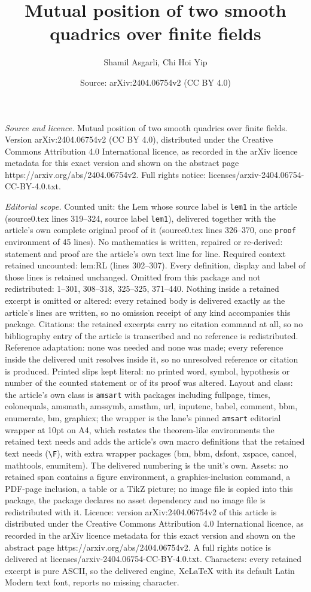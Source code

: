 \documentclass[10pt,a4paper]{amsart}
\title[Mutual position of two smooth quadrics over finite fields]{Mutual position of two smooth quadrics over finite fields}
\author{Shamil Asgarli, Chi Hoi Yip}
\date{Source: arXiv:2404.06754v2 (CC BY 4.0)}
\begin{document}
\maketitle

\noindent\emph{Source and licence.} Mutual position of two smooth quadrics over finite fields. Version arXiv:2404.06754v2 (CC BY 4.0), distributed under the Creative Commons Attribution 4.0 International licence, as recorded in the arXiv licence metadata for this exact version and shown on the abstract page https://arxiv.org/abs/2404.06754v2. Full rights notice: licenses/arxiv-2404.06754-CC-BY-4.0.txt.\par\smallskip

\noindent\textit{Editorial scope.} Counted unit: the Lem whose source label is \texttt{lem1} in the article (source0.tex lines 319--324, source label \texttt{lem1}), delivered together with the article's own complete original proof of it (source0.tex lines 326--370, one \texttt{proof} environment of 45 lines). No mathematics is written, repaired or re-derived: statement and proof are the article's own text line for line. Required context retained uncounted: lem:RL (lines 302--307). Every definition, display and label of those lines is retained unchanged. Omitted from this package and not redistributed: 1--301, 308--318, 325--325, 371--440. Nothing inside a retained excerpt is omitted or altered: every retained body is delivered exactly as the article's lines are written, so no omission receipt of any kind accompanies this package. Citations: the retained excerpts carry no citation command at all, so no bibliography entry of the article is transcribed and no reference is redistributed. Reference adaptation: none was needed and none was made; every reference inside the delivered unit resolves inside it, so no unresolved reference or citation is produced. Printed slips kept literal: no printed word, symbol, hypothesis or number of the counted statement or of its proof was altered. Layout and class: the article's own class is \texttt{amsart} with packages including fullpage, times, colonequals, amsmath, amssymb, amsthm, url, inputenc, babel, comment, bbm, enumerate, bm, graphicx; the wrapper is the lane's pinned \texttt{amsart} editorial wrapper at 10pt on A4, which restates the theorem-like environments the retained text needs and adds the article's own macro definitions that the retained text needs (\texttt{\textbackslash F}), with extra wrapper packages (bm, bbm, dsfont, xspace, cancel, mathtools, enumitem). The delivered numbering is the unit's own. Assets: no retained span contains a figure environment, a graphics-inclusion command, a PDF-page inclusion, a table or a TikZ picture; no image file is copied into this package, the package declares no asset dependency and no image file is redistributed with it. Licence: version arXiv:2404.06754v2 of this article is distributed under the Creative Commons Attribution 4.0 International licence, as recorded in the arXiv licence metadata for this exact version and shown on the abstract page https://arxiv.org/abs/2404.06754v2. A full rights notice is delivered at licenses/arxiv-2404.06754-CC-BY-4.0.txt. Characters: every retained excerpt is pure ASCII, so the delivered engine, XeLaTeX with its default Latin Modern text font, reports no missing character.
\end{document}
